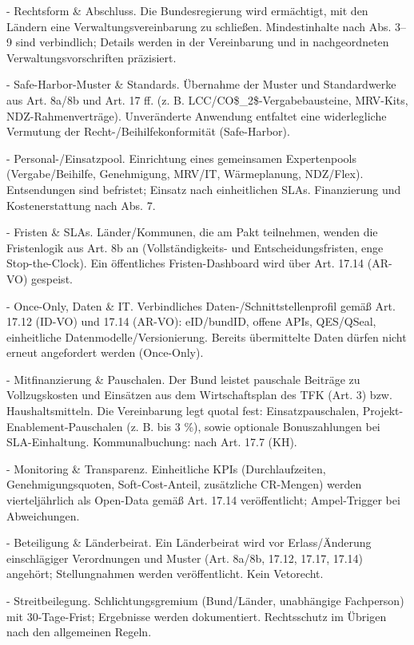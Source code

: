 \documentclass[12pt,a4paper]{scrartcl}
\begin{document}
- Rechtsform \& Abschluss. Die Bundesregierung wird ermächtigt, mit den Ländern eine Verwaltungsvereinbarung zu schließen. Mindestinhalte nach Abs. 3--9 sind verbindlich; Details werden in der Vereinbarung und in nachgeordneten Verwaltungsvorschriften präzisiert.

- Safe-Harbor-Muster \& Standards. Übernahme der Muster und Standardwerke aus Art. 8a/8b und Art. 17 ff. (z. B. LCC/CO\$\_2\$-Vergabebausteine, MRV-Kits, NDZ-Rahmenverträge). Unveränderte Anwendung entfaltet eine widerlegliche Vermutung der Recht-/Beihilfekonformität (Safe-Harbor).

- Personal-/Einsatzpool. Einrichtung eines gemeinsamen Expertenpools (Vergabe/Beihilfe, Genehmigung, MRV/IT, Wärmeplanung, NDZ/Flex). Entsendungen sind befristet; Einsatz nach einheitlichen SLAs. Finanzierung und Kostenerstattung nach Abs. 7.

- Fristen \& SLAs. Länder/Kommunen, die am Pakt teilnehmen, wenden die Fristenlogik aus Art. 8b an (Vollständigkeits- und Entscheidungsfristen, enge Stop-the-Clock). Ein öffentliches Fristen-Dashboard wird über Art. 17.14 (AR-VO) gespeist.

- Once-Only, Daten \& IT. Verbindliches Daten-/Schnittstellenprofil gemäß Art. 17.12 (ID-VO) und 17.14 (AR-VO): eID/bundID, offene APIs, QES/QSeal, einheitliche Datenmodelle/Versionierung. Bereits übermittelte Daten dürfen nicht erneut angefordert werden (Once-Only).

- Mitfinanzierung \& Pauschalen. Der Bund leistet pauschale Beiträge zu Vollzugskosten und Einsätzen aus dem Wirtschaftsplan des TFK (Art. 3) bzw. Haushaltsmitteln. Die Vereinbarung legt quotal fest: Einsatzpauschalen, Projekt-Enablement-Pauschalen (z. B. bis 3 \%), sowie optionale Bonuszahlungen bei SLA-Einhaltung. Kommunalbuchung: nach Art. 17.7 (KH).

- Monitoring \& Transparenz. Einheitliche KPIs (Durchlaufzeiten, Genehmigungsquoten, Soft-Cost-Anteil, zusätzliche CR-Mengen) werden vierteljährlich als Open-Data gemäß Art. 17.14 veröffentlicht; Ampel-Trigger bei Abweichungen.

- Beteiligung \& Länderbeirat. Ein Länderbeirat wird vor Erlass/Änderung einschlägiger Verordnungen und Muster (Art. 8a/8b, 17.12, 17.17, 17.14) angehört; Stellungnahmen werden veröffentlicht. Kein Vetorecht.

- Streitbeilegung. Schlichtungsgremium (Bund/Länder, unabhängige Fachperson) mit 30-Tage-Frist; Ergebnisse werden dokumentiert. Rechtsschutz im Übrigen nach den allgemeinen Regeln.
\end{document}
